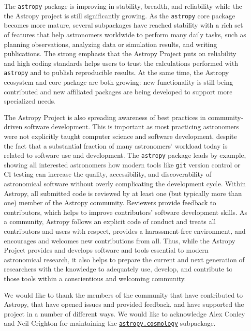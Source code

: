 \documentclass[modern]{aastex62}
\newcommand{\package}[1]{\texttt{#1}\xspace}
\newcommand{\astropy}{Astropy\xspace}
\newcommand{\astropypkg}{\package{astropy}}
\newcommand{\astropysubpkg}[1]{\href{http://docs.astropy.org/en/stable/#1/index.html}{\texttt{astropy.#1}}\xspace}
\begin{document}
The \astropypkg package is improving in stability, breadth, and reliability
while the the \astropy project is still significantly growing. 
As the \astropypkg core package becomes more mature, several subpackages have
reached stability with a rich set of features that help astronomers worldwide to
perform many daily tasks, such as planning observations, analyzing data or
simulation results, and writing publications.
The strong emphasis that the \astropy Project puts on reliability and high coding
standards helps users to trust the calculations performed with \astropypkg and
to publish reproducible results.
At the same time, the \astropy ecosystem and core package are both growing: new
functionality is still being contributed and new affiliated packages are being
developed to support more specialized needs.

The \astropy Project is also spreading awareness of best practices in
community-driven software development.
This is important as most practicing astronomers were not explicitly taught
computer science and software development, despite the fact that a substantial
fraction of many astronomers' workload today is related to software use
and development.
The \astropypkg package leads by example, showing all interested astronomers how
modern tools like \texttt{git} version control or CI testing can
increase the quality, accessibility, and discoverability of astronomical
software without overly complicating the development cycle.
Within \astropy, all submitted code is reviewed by at least one (but typically
more than one) member of the \astropy community. Reviewers provide feedback
to contributors, which helps to improve contributors' software development skills.
As a community, \astropy follows an explicit code of conduct \citep{ape8} and treats all
contributors and users with respect, provides a harassment-free environment, and
encourages and welcomes new contributions from all.
Thus, while the \astropy Project provides and develops software and tools
essential to modern astronomical research, it also helps to prepare the current
and next generation of researchers with the knowledge to adequately use,
develop, and contribute to those tools within a conscientious and welcoming
community.

\acknowledgments

We would like to thank the members of the community that have
contributed to \astropy,
that have opened issues and provided feedback, and have supported the
project in a number of different ways.  We would like to acknowledge
Alex Conley and Neil Crighton for maintaining the \astropysubpkg{cosmology}
subpackage.
\end{document}
